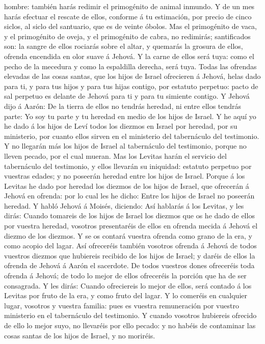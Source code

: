 hombre: también harás redimir el primogénito de animal inmundo.
 Y de un mes harás efectuar el rescate de ellos, conforme
á tu estimación, por precio de cinco siclos, al siclo del santuario, que
es de veinte óbolos.  Mas el primogénito de vaca, y el
primogénito de oveja, y el primogénito de cabra, no redimirás;
santificados son: la sangre de ellos rociarás sobre el altar, y quemarás
la grosura de ellos, ofrenda encendida en olor suave á Jehová.
 Y la carne de ellos será tuya: como el pecho de la
mecedura y como la espaldilla derecha, será tuya.  Todas
las ofrendas elevadas de las cosas santas, que los hijos de Israel
ofrecieren á Jehová, helas dado para ti, y para tus hijos y para tus
hijas contigo, por estatuto perpetuo: pacto de sal perpetuo es delante
de Jehová para ti y para tu simiente contigo.  Y Jehová
dijo á Aarón: De la tierra de ellos no tendrás heredad, ni entre ellos
tendrás parte: Yo soy tu parte y tu heredad en medio de los hijos de
Israel.  Y he aquí yo he dado á los hijos de Leví todos
los diezmos en Israel por heredad, por su ministerio, por cuanto ellos
sirven en el ministerio del tabernáculo del testimonio. 
Y no llegarán más los hijos de Israel al tabernáculo del testimonio,
porque no lleven pecado, por el cual mueran.  Mas los
Levitas harán el servicio del tabernáculo del testimonio, y ellos
llevarán su iniquidad: estatuto perpetuo por vuestras edades; y no
poseerán heredad entre los hijos de Israel.  Porque á los
Levitas he dado por heredad los diezmos de los hijos de Israel, que
ofrecerán á Jehová en ofrenda: por lo cual les he dicho: Entre los hijos
de Israel no poseerán heredad.  Y habló Jehová á Moisés,
diciendo:  Así hablarás á los Levitas, y les dirás:
Cuando tomareis de los hijos de Israel los diezmos que os he dado de
ellos por vuestra heredad, vosotros presentaréis de ellos en ofrenda
mecida á Jehová el diezmo de los diezmos.  Y se os
contará vuestra ofrenda como grano de la era, y como acopio del lagar.
 Así ofreceréis también vosotros ofrenda á Jehová de
todos vuestros diezmos que hubiereis recibido de los hijos de Israel; y
daréis de ellos la ofrenda de Jehová á Aarón el sacerdote.
 De todos vuestros dones ofreceréis toda ofrenda á
Jehová; de todo lo mejor de ellos ofreceréis la porción que ha de ser
consagrada.  Y les dirás: Cuando ofreciereis lo mejor de
ellos, será contado á los Levitas por fruto de la era, y como fruto del
lagar.  Y lo comeréis en cualquier lugar, vosotros y
vuestra familia: pues es vuestra remuneración por vuestro ministerio en
el tabernáculo del testimonio.  Y cuando vosotros
hubiereis ofrecido de ello lo mejor suyo, no llevaréis por ello pecado:
y no habéis de contaminar las cosas santas de los hijos de Israel, y no
moriréis.

